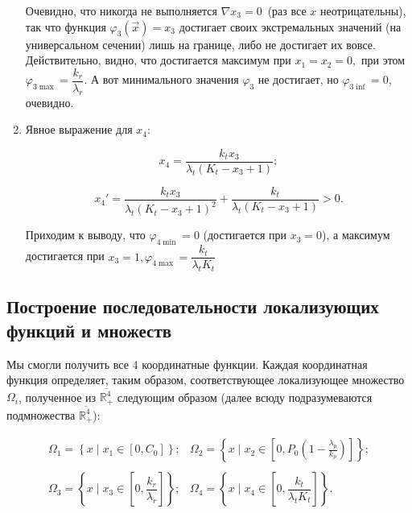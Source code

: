 \documentclass[12pt,a4paper]{article}
\begin{document}
\begin{enumerate}
        
    Очевидно, что никогда не выполняется \(\nabla x_3 = 0\,\) (раз все \(x\) неотрицательны), так что функция \(\varphi_3(\vec{x}) = x_3\) достигает своих экстремальных значений (на универсальном сечении) лишь на границе, либо не достигает их вовсе. Действительно, видно, что достигается максимум при \(x_1 = x_2 = 0,\) при этом \(\varphi_{3 \max} = \dfrac{k_r}{\lambda_r}\). А вот минимального значения \(\varphi_3\) не достигает, но \(\varphi_{3 \inf} = 0\), очевидно.

    \item Явное выражение для $x_4$:

        
        $$ x_4 = \frac{k_{t} x_{3}}{\lambda_{t} \left(K_{t} - x_{3} + 1\right)};$$

        
        $$x_4' = \dfrac{k_{t} x_{3}}{\lambda_{t} \left(K_{t} - x_{3} + 1\right)^{2}} + \dfrac{k_{t}}{\lambda_{t} \left(K_{t} - x_{3} + 1\right)} > 0.$$

        
        Приходим к выводу, что \(\varphi_{4 \min} = 0\) (достигается при
    \(x_3 = 0\)), а максимум достигается при $x_3 = 1,\varphi_{4 \max}
    = \dfrac{k_t}{\lambda_t K_t} $

\end{enumerate}

\subsection{Построение последовательности локализующих функций и множеств}

Мы смогли получить все 4 координатные функции. Каждая координатная
функция определяет, таким образом, соответствующее локализующее
множество \(\Omega_i\), полученное из \(\overline{\mathbb{R}_{+}^{4}}\)
следующим образом (далее всюду подразумеваются подмножества
\(\overline{\mathbb{R}_{+}^{4}}\)):

\begin{equation*}    
    \begin{matrix}
    \Omega_1 = \left\{
            x \;\big|\; x_1 \in \left[ 0, C_0  \right]
                \right\}; 
    &
    \Omega_2 = \left\{
            x \;\Big|\; x_2 \in \left[ 0, 
            P_0 \left( 1 - \frac{\lambda_p}{k_p}\right)  \right]  
            \right\};
    \\ \\
    \Omega_3 = \left\{
        x \;\Big|\; x_3 \in \left[ 0, \dfrac{k_r}{\lambda_r}  \right]
            \right\};
    &
    \Omega_4 = \left\{
        x \;\Big|\; x_4 \in \left[ 0, \dfrac{k_t}{\lambda_t K_t} \right]
            \right\}.
    \end{matrix}
\end{equation*}
\end{document}
